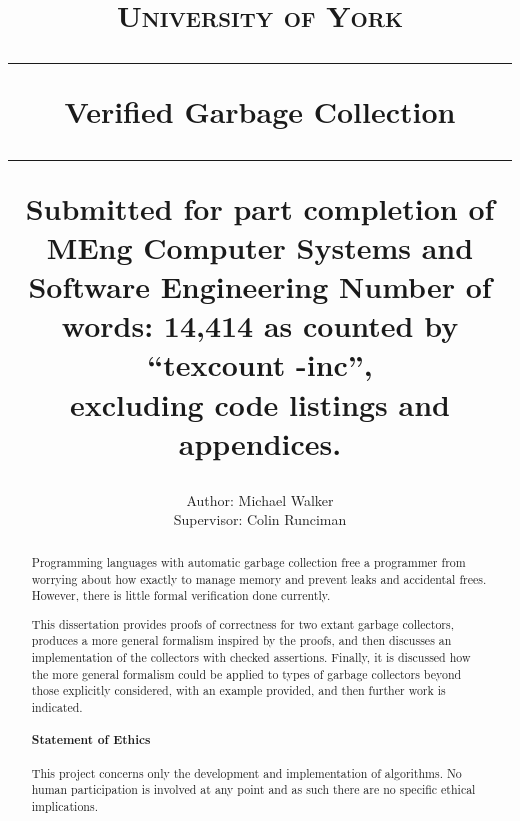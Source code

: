 \documentclass[11pt,a4paper,twoside,openany]{report}
\title{%
{\normalsize\scshape University of York}\\
\vspace{2em}
\hrule
\vspace{1em}
{\huge\bfseries Verified Garbage Collection}\\
\vspace{1em}
\hrule
\vspace{1em}
{\small Submitted for part completion of MEng Computer Systems and Software Engineering}
\vfill%
{\normalsize Number of words: 14,414 as counted by ``texcount -inc'',\\
excluding code listings and appendices.}
}
\author{%
Author: Michael Walker\\
Supervisor: Colin Runciman
}
\date{}
\theoremstyle{example}
\newenvironment{lscape2col}{%
  \begin{landscape}%
    \setlength{\topsep}{0pt}%
    \addtolength{\leftmargin}{-1cm}%
    \addtolength{\rightmargin}{-1cm}%
    \setlength{\listparindent}{\parindent}%
    \setlength{\itemindent}{\parindent}%
    \setlength{\parsep}{\parskip}%
    \setlength{\columnsep}{1.5cm}%
    \begin{multicols}{2}%
}{%
    \end{multicols}%
  \end{landscape}%
}
\begin{document}

\pagestyle{empty}

\maketitle

\cleardoublepage
\begin{abstract}
Programming languages with automatic garbage collection free a
programmer from worrying about how exactly to manage memory and
prevent leaks and accidental frees. However, there is little formal
verification done currently.

This dissertation provides proofs of correctness for two extant
garbage collectors, produces a more general formalism inspired by the
proofs, and then discusses an implementation of the collectors with
checked assertions. Finally, it is discussed how the more general
formalism could be applied to types of garbage collectors beyond those
explicitly considered, with an example provided, and then further work
is indicated.

\vfill

\paragraph{Statement of Ethics}

This project concerns only the development and implementation of
algorithms. No human participation is involved at any point and as
such there are no specific ethical implications.
\end{abstract}


\cleardoublepage
\pagestyle{plain}
\setcounter{page}{1}
\tableofcontents

\listoffigures

\glsaddall
\printglossaries

\newpage
\cleardoublepage
{}










\begin{appendices}
\begin{lscape2col}
  
\end{lscape2col}
\end{appendices}



\end{document}
